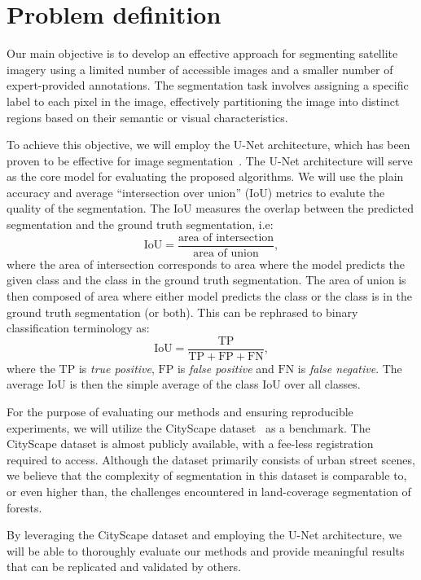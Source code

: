 \section{Problem definition}
Our main objective is to develop an effective approach for segmenting satellite imagery using a limited number of 
accessible images and a smaller number of expert-provided annotations. The segmentation task involves assigning a 
specific label to each pixel in the image, effectively partitioning the image into distinct regions based on their 
semantic or visual characteristics.

To achieve this objective, we will employ the U-Net architecture, which has been proven to be effective for image 
segmentation~\cite{unet-2015}. The U-Net architecture will serve as the core model for evaluating the proposed algorithms.
We will use the plain accuracy and average ``intersection over union'' (IoU) metrics to evalute the 
quality of the segmentation. The IoU measures the overlap between the predicted segmentation and the ground truth 
segmentation, i.e:
$$
\mathrm{IoU} = \frac{\text{area of intersection}}{\text{area of union}},
$$
where the area of intersection corresponds to area where the model predicts the given class and the class in the ground truth segmentation.
The area of union is then composed of area where either model predicts the class or the class is in the ground truth segmentation (or both).
This can be rephrased to binary classification terminology as: 
$$
\mathrm{IoU} = \frac{\mathrm{TP}}{\mathrm{TP}+\mathrm{FP}+\mathrm{FN}},
$$
where the $\mathrm{TP}$ is \textit{true positive}, $\mathrm{FP}$ is \textit{false positive} and $\mathrm{FN}$ is \textit{false negative}. 
The average IoU is then the simple average of the class IoU over all classes. 

For the purpose of evaluating our methods and ensuring reproducible experiments, we will utilize the CityScape 
dataset~\cite{cityscapes-2016} as a benchmark. The CityScape dataset is almost publicly available, with a fee-less 
registration required to access. Although the dataset primarily consists of urban street scenes, we believe 
that the complexity of segmentation in this dataset is comparable to, or even higher than, the challenges encountered in 
land-coverage segmentation of forests.

By leveraging the CityScape dataset and employing the U-Net architecture, we will be able to thoroughly evaluate our 
methods and provide meaningful results that can be replicated and validated by others.


